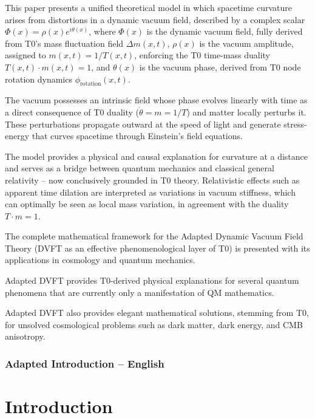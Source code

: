 \begin{t0box}[Summary]
		This paper presents a unified theoretical model in which spacetime curvature arises from distortions in a dynamic vacuum field, described by a complex scalar $\Phi(x)=\rho(x)e^{i\theta(x)}$, where $\Phi(x)$ is the dynamic vacuum field, fully derived from T0's mass fluctuation field $\Delta m(x,t)$, $\rho(x)$ is the vacuum amplitude, assigned to $m(x,t) = 1/T(x,t)$, enforcing the T0 time-mass duality $T(x,t) \cdot m(x,t) = 1$, and $\theta(x)$ is the vacuum phase, derived from T0 node rotation dynamics $\phi_{\text{rotation}}(x,t)$.
		
		The vacuum possesses an intrinsic field whose phase evolves linearly with time as a direct consequence of T0 duality ($\dot{\theta} = m = 1/T$) and matter locally perturbs it. These perturbations propagate outward at the speed of light and generate stress-energy that curves spacetime through Einstein's field equations.
		
		The model provides a physical and causal explanation for curvature at a distance and serves as a bridge between quantum mechanics and classical general relativity – now conclusively grounded in T0 theory. Relativistic effects such as apparent time dilation are interpreted as variations in vacuum stiffness, which can optimally be seen as local mass variation, in agreement with the duality $T \cdot m = 1$.
		
		The complete mathematical framework for the Adapted Dynamic Vacuum Field Theory (DVFT as an effective phenomenological layer of T0) is presented with its applications in cosmology and quantum mechanics.
		
		Adapted DVFT provides T0-derived physical explanations for several quantum phenomena that are currently only a manifestation of QM mathematics.
		
		Adapted DVFT also provides elegant mathematical solutions, stemming from T0, for unsolved cosmological problems such as dark matter, dark energy, and CMB anisotropy.
	\end{t0box}
	
	\subsubsection{Adapted Introduction – English}
	
	\section{Introduction}
	
